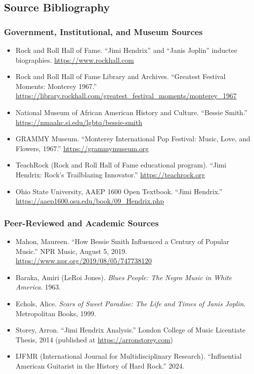 \documentclass[11pt,letterpaper]{article}
\begin{document}
\subsection{Source Bibliography}

\subsubsection{Government, Institutional, and Museum Sources}
\begin{itemize}[leftmargin=*]
  \item Rock and Roll Hall of Fame. ``Jimi Hendrix'' and ``Janis Joplin'' inductee biographies. \url{https://www.rockhall.com}
  \item Rock and Roll Hall of Fame Library and Archives. ``Greatest Festival Moments: Monterey 1967.'' \url{https://library.rockhall.com/greatest_festival_moments/monterey_1967}
  \item National Museum of African American History and Culture. ``Bessie Smith.'' \url{https://nmaahc.si.edu/lgbtq/bessie-smith}
  \item GRAMMY Museum. ``Monterey International Pop Festival: Music, Love, and Flowers, 1967.'' \url{https://grammymuseum.org}
  \item TeachRock (Rock and Roll Hall of Fame educational program). ``Jimi Hendrix: Rock's Trailblazing Innovator.'' \url{https://teachrock.org}
  \item Ohio State University, AAEP 1600 Open Textbook. ``Jimi Hendrix.'' \url{https://aaep1600.osu.edu/book/09_Hendrix.php}
\end{itemize}

\subsubsection{Peer-Reviewed and Academic Sources}
\begin{itemize}[leftmargin=*]
  \item Mahon, Maureen. ``How Bessie Smith Influenced a Century of Popular Music.'' NPR Music, August 5, 2019. \url{https://www.npr.org/2019/08/05/747738120}
  \item Baraka, Amiri (LeRoi Jones). \textit{Blues People: The Negro Music in White America}. 1963.
  \item Echols, Alice. \textit{Scars of Sweet Paradise: The Life and Times of Janis Joplin}. Metropolitan Books, 1999.
  \item Storey, Arron. ``Jimi Hendrix Analysis.'' London College of Music Licentiate Thesis, 2014 (published at \url{https://arronstorey.com})
  \item IJFMR (International Journal for Multidisciplinary Research). ``Influential American Guitarist in the History of Hard Rock.'' 2024.
\end{itemize}
\end{document}
